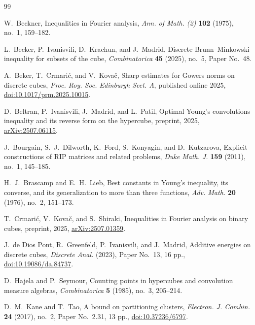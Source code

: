 \documentclass[11pt,reqno]{amsart}
\numberwithin{equation}{section}
\theoremstyle{definition}
\theoremstyle{remark}
\begin{document}
\small
\begin{thebibliography}{99}

W.~Beckner,
\newblock Inequalities in Fourier analysis,
\newblock \emph{Ann. of Math. (2)} \textbf{102} (1975), no.~1, 159--182.

L.~Becker, P.~Ivanisvili, D.~Krachun, and J.~Madrid,
\newblock Discrete Brunn--Minkowski inequality for subsets of the cube,
\newblock \emph{Combinatorica} \textbf{45} (2025), no.~5, Paper No.~48.

A.~Beker, T.~Crmari\'c, and V.~Kova\v{c},
\newblock Sharp estimates for Gowers norms on discrete cubes,
\newblock \emph{Proc. Roy. Soc. Edinburgh Sect. A}, published online 2025,
\newblock \href{https://doi.org/10.1017/prm.2025.10015}{doi:10.1017/prm.2025.10015}.

D.~Beltran, P.~Ivanisvili, J.~Madrid, and L.~Patil,
\newblock Optimal Young's convolutions inequality and its reverse form on the hypercube,
\newblock preprint, 2025, \href{https://arxiv.org/abs/2507.06115}{arXiv:2507.06115}.

J.~Bourgain, S.~J.~Dilworth, K.~Ford, S.~Konyagin, and D.~Kutzarova,
\newblock Explicit constructions of RIP matrices and related problems,
\newblock \emph{Duke Math. J.} \textbf{159} (2011), no.~1, 145--185.

H.~J.~Brascamp and E.~H.~Lieb,
\newblock Best constants in Young's inequality, its converse, and its generalization to more than three functions,
\newblock \emph{Adv. Math.} \textbf{20} (1976), no.~2, 151--173.

T.~Crmari\'c, V.~Kova\v{c}, and S.~Shiraki,
\newblock Inequalities in Fourier analysis on binary cubes,
\newblock preprint, 2025, \href{https://arxiv.org/abs/2507.01359}{arXiv:2507.01359}.

J.~de Dios Pont, R.~Greenfeld, P.~Ivanisvili, and J.~Madrid,
\newblock Additive energies on discrete cubes,
\newblock \emph{Discrete Anal.} (2023), Paper No.~13, 16 pp.,
\newblock \href{https://doi.org/10.19086/da.84737}{doi:10.19086/da.84737}.

D.~Hajela and P.~Seymour,
\newblock Counting points in hypercubes and convolution measure algebras,
\newblock \emph{Combinatorica} \textbf{5} (1985), no.~3, 205--214.

D.~M.~Kane and T.~Tao,
\newblock A bound on partitioning clusters,
\newblock \emph{Electron. J. Combin.} \textbf{24} (2017), no.~2, Paper No.~2.31, 13 pp.,
\newblock \href{https://doi.org/10.37236/6797}{doi:10.37236/6797}.


\end{thebibliography}
\end{document}
